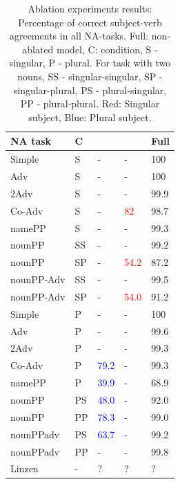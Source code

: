 \begin{center}
\begin{table}[ht]
\centering
\begin{tabular}{|P{2.3cm}|P{0.4cm}||P{0.6cm}|P{0.6cm}|P{0.6cm}|}
\hline
\B NA task & \B C &  &  & \B Full \\
\hline
\hline


Simple & S & - &  - &  100 \\

Adv & S & - &  - &  100 \\

2Adv & S & - &  - &  99.9 \\

Co-Adv & S & - &  \textcolor{red}{82} &  98.7 \\

namePP & S & - &  - &  99.3 \\

nounPP & SS & - &  - &  99.2 \\

nounPP & SP &  - &  \textcolor{red}{54.2} &  87.2 \\

nounPP-Adv & SS &  - &  - & 99.5 \\

nounPP-Adv & SP &  - &  \textcolor{red}{54.0} & 91.2 \\


\hline
Simple & P &  - &  - &  100 \\

Adv & P &  - &  - &  99.6 \\

2Adv & P & - &  - &  99.3 \\

Co-Adv & P &  \textcolor{blue}{79.2} &  - &  99.3 \\

namePP & P & \textcolor{blue}{39.9} &  - &  68.9 \\

nounPP & PS &  \textcolor{blue}{48.0} & - &  92.0 \\

nounPP & PP &  \textcolor{blue}{78.3} & - &  99.0 \\

nounPPadv & PS & \textcolor{blue}{63.7} &  - &  99.2 \\

nounPPadv & PP & - &  - &  99.8 \\

\hline
\hline
\B Linzen & \B - &  ? &  ? &  ? \\
\hline
\end{tabular}
\caption{Ablation experiments results: Percentage of correct subject-verb agreements in all NA-tasks. Full: non-ablated model, C: condition, S - singular, P - plural. For task with two nouns, SS - singular-singular, SP - singular-plural, PS - plural-singular, PP - plural-plural. Red: Singular subject, Blue: Plural subject. \label{tab:ablation-results}}
\end{table}
\end{center}

